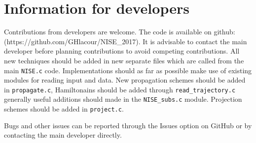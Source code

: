 \chapter{Information for developers\label{chap:developers}}
Contributions from developers are welcome. The code is available on
github:\\ (https://github.com/GHlacour/NISE\_2017). It is advisable to contact the main developer before planning contributions to avoid competing contributions. All new techniques should be added in new separate files which are called from the main {\tt NISE.c} code. 
Implementations should as far as possible make use of existing modules for reading input and data. New propagation schemes should be added in {\tt propagate.c}, Hamiltonains should be added through {\tt read\_trajectory.c} generally useful additions should made in the {\tt NISE\_subs.c} module. Projection schemes should be added in {\tt project.c}.

Bugs and other issues can be reported through the Issues option on GitHub or by contacting the main developer directly.
